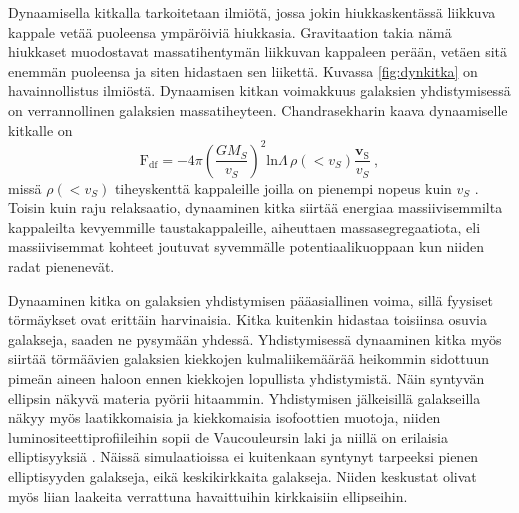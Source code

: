 \documentclass[12pt,a4paper]{article}
\begin{document}
Dynaamisella kitkalla tarkoitetaan ilmiötä, jossa jokin hiukkaskentässä liikkuva kappale vetää puoleensa ympäröiviä hiukkasia. Gravitaation takia nämä hiukkaset muodostavat massatihentymän liikkuvan kappaleen perään, vetäen sitä enemmän puoleensa ja siten hidastaen sen liikettä. Kuvassa \ref{fig:dynkitka} on havainnollistus ilmiöstä. Dynaamisen kitkan voimakkuus galaksien yhdistymisessä on verrannollinen galaksien massatiheyteen. Chandrasekharin kaava dynaamiselle kitkalle on
\begin{equation}
\mathrm{F_{df}} = - 4 \pi \left( \frac{G M_S}{v_S} \right)^2 \mathrm{ln} \Lambda \, \rho (< v_S) \frac{\mathrm{\textbf{v}_S}}{v_S} \ ,
\end{equation}
missä $\rho (< v_S)$ tiheyskenttä kappaleille joilla on pienempi nopeus kuin $v_S$ \citep{galform}. Toisin kuin raju relaksaatio, dynaaminen kitka siirtää energiaa massiivisemmilta kappaleilta kevyemmille taustakappaleille, aiheuttaen massasegregaatiota, eli massiivisemmat kohteet joutuvat syvemmälle potentiaalikuoppaan kun niiden radat pienenevät. 

Dynaaminen kitka on galaksien yhdistymisen pääasiallinen voima, sillä fyysiset törmäykset ovat erittäin harvinaisia. Kitka kuitenkin hidastaa toisiinsa osuvia galakseja, saaden ne pysymään yhdessä. Yhdistymisessä dynaaminen kitka myös siirtää törmäävien galaksien kiekkojen kulmaliikemäärää heikommin sidottuun pimeän aineen haloon ennen kiekkojen lopullista yhdistymistä. Näin syntyvän ellipsin näkyvä materia pyörii hitaammin. Yhdistymisen jälkeisillä galakseilla näkyy myös laatikkomaisia ja kiekkomaisia isofoottien muotoja, niiden luminositeettiprofiileihin sopii de Vaucouleursin laki ja niillä on erilaisia elliptisyyksiä \citep{hernquist:1992, barnes:1992}. Näissä simulaatioissa ei kuitenkaan syntynyt tarpeeksi pienen elliptisyyden galakseja, eikä keskikirkkaita galakseja. Niiden keskustat olivat myös liian laakeita verrattuna havaittuihin kirkkaisiin ellipseihin.
\end{document}
